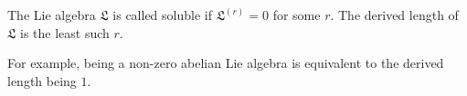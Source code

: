 The Lie algebra $\mathfrak{L}$ is called soluble if $\mathfrak{L}^{(r)} = 0$ for
some $r$. The derived length of $\mathfrak{L}$ is the least such $r$.

For example, being a non-zero abelian Lie algebra is equivalent to the derived length
being $1$.
